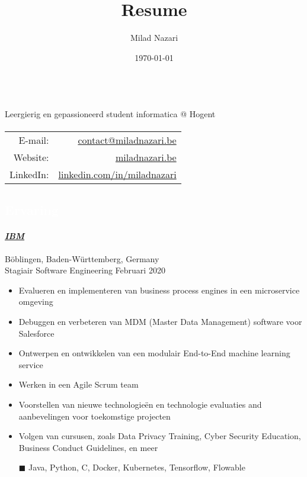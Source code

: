 \documentclass[a4paper, twoside]{article}
\title{Resume}
\author{ Milad Nazari }
\date{\today}
\begin{document}
\begin{multicols}{2}
\\
\noindent Leergierig en gepassioneerd student informatica @ Hogent
\paragraph{}
{\small
\hfill
\begin{tabular}{rr}
\textcolor{blueDark}{E-mail:} & \href{ mailto:contact@miladnazari.be }{ contact@miladnazari.be } \\
\textcolor{blueDark}{Website:} & \href{ https://miladnazari.be }{ miladnazari.be } \\
\textcolor{blueDark}{LinkedIn}: & \href{ https://linkedin.com/in/miladnazari }{ linkedin.com/in/miladnazari }
\end{tabular}
}
\end{multicols}
\begin{mdframed}
\section*{\textcolor{white}{ Ervaring }}
\end{mdframed}
\paragraph{\textbf{\textit{\href{https://https://www.ibm.com }{\textcolor{blueDark}{ IBM }}}}} \hfill\small Böblingen, Baden-Württemberg, Germany \\
Stagiair Software Engineering \hfill\small
Februari 2020
\begin{itemize}
\itemsep-0.2em
\item Evalueren en implementeren van business process engines in een microservice omgeving
\item Debuggen en verbeteren van MDM (Master Data Management) software voor Salesforce
\item Ontwerpen en ontwikkelen van een modulair End-to-End machine learning service
\item Werken in een Agile Scrum team
\item Voorstellen van nieuwe technologieën en technologie evaluaties and aanbevelingen voor toekomstige projecten
\item Volgen van cursusen, zoals Data Privacy Training, Cyber Security Education, Business Conduct Guidelines, en meer
\item[\color{orange}$\blacksquare$] Java, Python, C, Docker, Kubernetes, Tensorflow, Flowable
\end{itemize}
\end{document}
